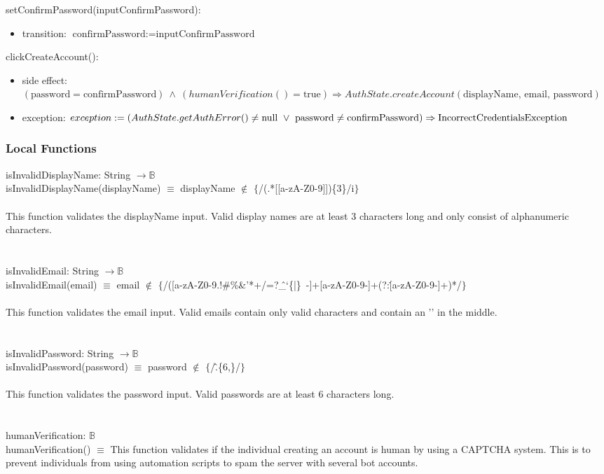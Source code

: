 \documentclass[12pt, titlepage]{article}
\begin{document}
\noindent setConfirmPassword(inputConfirmPassword):
\begin{itemize}
\item transition: $\text{confirmPassword} := \text{inputConfirmPassword}$
\end{itemize}

\noindent clickCreateAccount():
\begin{itemize}
\item side effect: \\$(\text{password} = \text{confirmPassword}) \ \land \ (humanVerification() = \text{true}) \Rightarrow AuthState.createAccount(\text{displayName, email, password})$
\item exception: $exception := (AuthState.getAuthError() \neq \text{null} \ \lor \  \text{password} \neq \text{confirmPassword}) \\ \Rightarrow \text{IncorrectCredentialsException}$ 
\end{itemize}

\subsubsection{Local Functions}
isInvalidDisplayName: String $\rightarrow \mathbb{B}$  \\
isInvalidDisplayName(displayName) $\equiv$ displayName $\notin$ $\{$/(.*[[a-zA-Z0-9]])\{3\}/i$\}$ 
\\ \\
This function validates the displayName input. Valid display names are at least 3 characters long and only consist of alphanumeric characters. \\ 
\\ 
\\
isInvalidEmail: String $\rightarrow \mathbb{B}$  \\
isInvalidEmail(email) $\equiv$ email $\notin$ $\{$/([a-zA-Z0-9.!\#\%\&'*+/=?\^\_`\{|\}~-]+\@[a-zA-Z0-9-]+(?:\.[a-zA-Z0-9-]+)*/$\}$ 
\\ \\
This function validates the email input. Valid emails contain only valid characters and contain an '\@' in the middle. \\
\\
\\
isInvalidPassword: String $\rightarrow \mathbb{B}$  \\
isInvalidPassword(password) $\equiv$ password $\notin$ $\{$/\^.\{6,\}/$\}$ 
\\ \\
This function validates the password input. Valid passwords are at least 6 characters long.  
\\ \\
\\
humanVerification: $\mathbb{B}$\\
humanVerification() $\equiv$ This function validates if the individual creating an account is human by using a CAPTCHA system. This is to prevent individuals from using automation scripts to spam the server with several bot accounts.
\end{document}
